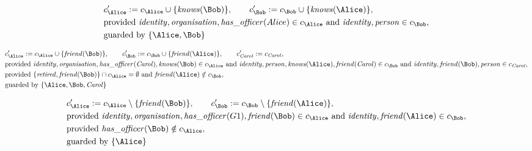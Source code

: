 \begin{align*}
&
c'_
{
\Alice
}
 := 
c_
{
\Alice
}
 \cup 
\{
\mathit{\detokenize{
knows
}}
(
\Bob
)
\}
, \qquad 
c'_
{
\Bob
}
 := 
c_
{
\Bob
}
 \cup 
\{
\mathit{\detokenize{
knows
}}
(
\Alice
)
\}
,\\
&
\text{provided } 
\mathit{\detokenize{
identity
}}
,
\mathit{\detokenize{
organisation
}}
,
\mathit{\detokenize{
has_officer
}}
(
Alice
)
 \in c_
{
\Alice
}
 \text{ and } 
\mathit{\detokenize{
identity
}}
,
\mathit{\detokenize{
person
}}
 \in c_
{
\Bob
}
,\\
&
\text{guarded by } \{
\Alice
,
\Bob
\}
\end{align*}

\begin{align*}
&
c'_
{
\Alice
}
 := 
c_
{
\Alice
}
 \cup 
\{
\mathit{\detokenize{
friend
}}
(
\Bob
)
\}
, \qquad 
c'_
{
\Bob
}
 := 
c_
{
\Bob
}
 \cup 
\{
\mathit{\detokenize{
friend
}}
(
\Alice
)
\}
, \qquad 
c'_
{
\mathit{Carol}
}
 := 
c_
{
\mathit{Carol}
}
,\\
&
\text{provided } 
\mathit{\detokenize{
identity
}}
,
\mathit{\detokenize{
organisation
}}
,
\mathit{\detokenize{
has_officer
}}
(
\mathit{Carol}
)
,
\mathit{\detokenize{
knows
}}
(
\Bob
)
 \in c_
{
\Alice
}
 \text{ and } 
\mathit{\detokenize{
identity
}}
,
\mathit{\detokenize{
person
}}
,
\mathit{\detokenize{
knows
}}
(
\Alice
)
,
\mathit{\detokenize{
friend
}}
(
\mathit{Carol}
)
 \in c_
{
\Bob
}
 \text{ and } 
\mathit{\detokenize{
identity
}}
,
\mathit{\detokenize{
friend
}}
(
\Bob
)
,
\mathit{\detokenize{
person
}}
 \in c_
{
\mathit{Carol}
}
,\\
&
\text{provided } 
\{
\mathit{\detokenize{
retired
}}
,
\mathit{\detokenize{
friend
}}
(
\Bob
)
\}
 \cap c_
{
\Alice
}
 = \emptyset
 \text{ and } 
\mathit{\detokenize{
friend
}}
(
\Alice
)
 \notin c_
{
\Bob
}
,\\
&
\text{guarded by } \{
\Alice
,
\Bob
,
\mathit{Carol}
\}
\end{align*}

\begin{align*}
&
c'_
{
\Alice
}
 := 
c_
{
\Alice
}
 \setminus 
\{
\mathit{\detokenize{
friend
}}
(
\Bob
)
\}
, \qquad 
c'_
{
\Bob
}
 := 
c_
{
\Bob
}
 \setminus 
\{
\mathit{\detokenize{
friend
}}
(
\Alice
)
\}
,\\
&
\text{provided } 
\mathit{\detokenize{
identity
}}
,
\mathit{\detokenize{
organisation
}}
,
\mathit{\detokenize{
has_officer
}}
(
G1
)
,
\mathit{\detokenize{
friend
}}
(
\Bob
)
 \in c_
{
\Alice
}
 \text{ and } 
\mathit{\detokenize{
identity
}}
,
\mathit{\detokenize{
friend
}}
(
\Alice
)
 \in c_
{
\Bob
}
,\\
&
\text{provided } 
\mathit{\detokenize{
has_officer
}}
(
\Bob
)
 \notin c_
{
\Alice
}
,\\
&
\text{guarded by } \{
\Alice
\}
\end{align*}
